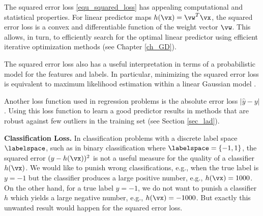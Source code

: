 \documentclass[12pt]{report}
\begin{document}
The squared error loss \eqref{equ_squared_loss} has appealing computational and statistical 
properties. For linear predictor maps $h(\vx) = \vw^{T} \vx$, the squared error loss is a 
convex and differentiable function of the weight vector $\vw$. This allows, in turn, to efficiently 
search for the optimal linear predictor using efficient iterative optimization methods (see Chapter \ref{ch_GD}). 

The squared error loss also has a useful interpretation in terms of a probabilistic 
model for the features and labels. In particular, minimizing the squared error loss 
is equivalent to maximum likelihood estimation within a linear Gaussian model \cite[Sec. 2.6.3]{hastie01statisticallearning}. 

Another loss function used in regression problems is the absolute error loss $|\hat{y} - y|$. 
Using this loss function to learn a good predictor results in methods that are robust 
against few outliers in the training set (see Section \ref{sec_lad}).  

{\bf Classification Loss.} In classification problems with a discrete label space $\labelspace$, 
such as in binary classification where $\labelspace = \{-1,1\}$, the squared error $(y - h(\vx))^2$ 
is not a useful measure for the quality of a classifier $h(\vx)$. We would like to punish wrong 
classifications, e.g., when the true label is $y=-1$ but the classifier produces a large positive 
number, e.g., $h(\vx) = 1000$. On the other hand, for a true label $y=-1$, we do not want to 
punish a classifier $h$ which yields a large negative number, e.g., $h(\vx) = -1000$. But exactly 
this unwanted result would happen for the squared error loss. 
\end{document}
